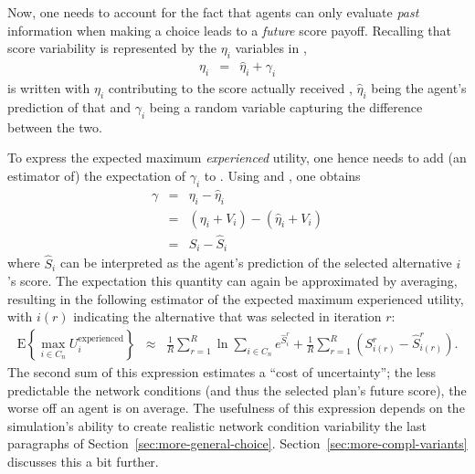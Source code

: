 Now, one needs to account for the fact that agents can only evaluate 
\emph{past} information when making a choice leads to a \emph{future} 
score payoff.
Recalling that score variability is represented by the $\eta_i$ variables 
in ,
\begin{eqnarray}
\eta_{i} & = & \hat{\eta}_{i} +\gamma_{i}\label{eq:score-random-walk}
\end{eqnarray}
is written with $\eta_{i}$ contributing to the score actually received
, $\hat{\eta}_{i}$ being the agent's prediction
of that and $\gamma_i$ being a random variable capturing the
difference between the two. 

To express the expected maximum \emph{experienced}
utility, one hence needs to add (an estimator of) the expectation of $\gamma_i$
to .
Using  and ,
one obtains
\begin{eqnarray}
\gamma & = & \eta_{i} - \hat{\eta}_{i}\\
& = & (\eta_{i} + V_i) - (\hat{\eta}_{i} + V_i)\\
 & = & S_i - \hat{S}_i
\end{eqnarray}
where $\hat{S}_i$ can be interpreted as the agent's prediction of
the selected alternative $i$'s score.
The expectation  this quantity can again be approximated by
averaging, resulting in the following estimator of the expected maximum experienced
utility, with $i(r)$ indicating the alternative that was selected in
iteration $r$:
\begin{eqnarray}
\text{E}\left\{\max_{i\in C_n} U_i^\text{experienced} \right\}
& \approx &
\frac{1}{R}\sum_{r=1}^{R}\ln\sum_{i\in C_n}e^{\hat{S}_i^{r}}
+
\frac{1}{R}\sum_{r=1}^{R}\left(S_{i(r)}^{r}-\hat{S}_{i(r)}^{r}\right).
\label{eq:wartezimmer-corrected}
\end{eqnarray}
%
The second sum of this expression estimates a ``cost of uncertainty''; the
less predictable the network conditions (and thus the selected plan's future score),
the worse off an agent is\corr{,}{} on average. The usefulness of this
expression depends on the simulation's ability to create realistic
network condition variability the last paragraphs of Section~\ref{sec:more-general-choice}.
Section~\ref{sec:more-compl-variants} discusses this a bit further.
 
